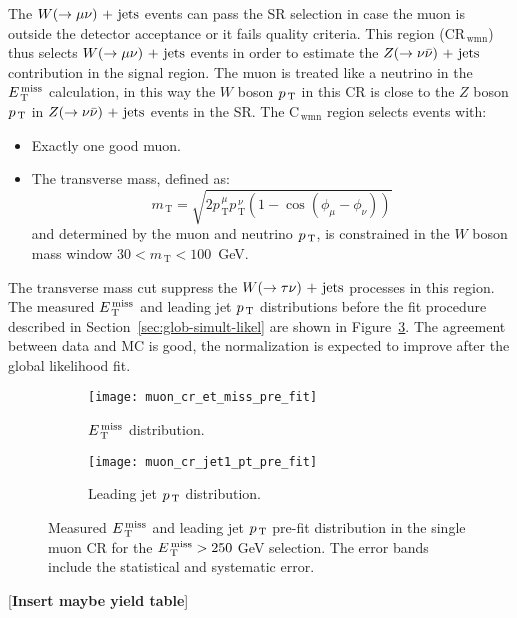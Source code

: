 The $W (\rightarrow \mu \nu)\mathrm{~+~jets}$ events can pass the SR selection in case the muon is
outside the detector acceptance or it fails quality criteria. This region
(CR$_\mathrm{\, wmn}$) thus selects $W (\rightarrow \mu \nu)\mathrm{~+~jets}$ events in order to estimate
the $Z (\rightarrow \nu \bar{\nu})\mathrm{~+~jets}$ contribution in the signal region. The muon is treated like
a neutrino in the $E_\mathrm{\, T}^\mathrm{\, miss}$ calculation, in this way the $W$ boson $p_\mathrm{\, T}$ in this CR
is close to the $Z$ boson $p_\mathrm{\, T}$ in $Z (\rightarrow \nu \bar{\nu})\mathrm{~+~jets}$ events in the SR\@. The
C$_{\mathrm{\, wmn}}$ region selects events with:
\begin{itemize}
\item Exactly one good muon.
\item The transverse mass, defined as:
  \begin{equation}
    \label{eq:82}
    m_\mathrm{\, T} = \sqrt{2 p_\mathrm{\, T}^{\, \mu} p_\mathrm{\, T}^{\, \nu}
      (1 - \cos(\phi_\mu - \phi_\nu))}
  \end{equation}
  and determined by the muon and neutrino $p_\mathrm{\, T}$, is constrained in the
  $W$ boson mass window $30 < m_\mathrm{\, T} < 100$~GeV.
\end{itemize}
The transverse mass cut suppress the $W (\rightarrow \tau \nu)\mathrm{~+~jets}$ processes in this
region. The measured $E_\mathrm{\, T}^\mathrm{\, miss}$ and leading jet $p_\mathrm{\, T}$ distributions before the fit
procedure described in Section~\ref{sec:glob-simult-likel} are shown in
Figure~\ref{fig:muon_cr_plots}. The agreement between data and MC is good, the
normalization is expected to improve after the global likelihood fit.

\begin{figure}[!h]
  \centering
  \begin{subfigure}[t]{.48\linewidth}
    \texttt{[image: muon\_cr\_et\_miss\_pre\_fit]}
    \caption{$E_\mathrm{\, T}^\mathrm{\, miss}$ distribution.}
    \label{fig:muon_cr_et_miss_pre_fit}
  \end{subfigure}
  \begin{subfigure}[t]{.48\linewidth}
    \texttt{[image: muon\_cr\_jet1\_pt\_pre\_fit]}
    \caption{Leading jet $p_\mathrm{\, T}$ distribution.}
    \label{fig:muon_cr_jet1_pt_pre_fit}
  \end{subfigure}
  \caption{Measured $E_\mathrm{\, T}^\mathrm{\, miss}$ and leading jet $p_\mathrm{\, T}$ pre-fit distribution in the
    single muon CR for the $E_\mathrm{\, T}^\mathrm{\, miss} > 250~$GeV selection. The error bands include
    the statistical and systematic error.}
  \label{fig:muon_cr_plots}
\end{figure}

\mbox{}

[\textbf{Insert maybe yield table}]
